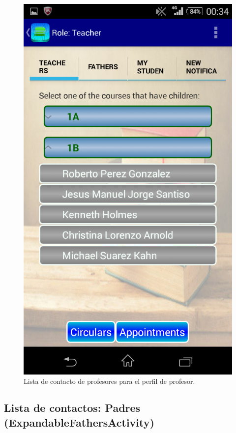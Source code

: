 			\begin{figure}[h !]
				\centering
				\includegraphics[scale=0.2]{Imagenes/App/profeProfe}
				\caption{Lista de contacto de profesores para el perfil de profesor.}
				\label{fig:profeProfe}
			\end{figure}
		
		\subsection{Lista de contactos: Padres (ExpandableFathersActivity)}
		
